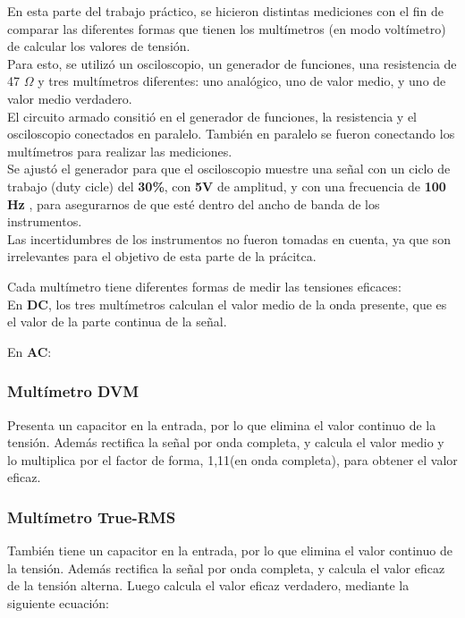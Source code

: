 \documentclass{article}
\begin{document}
En esta parte del trabajo práctico, se hicieron distintas mediciones con el fin de comparar las diferentes formas que tienen los multímetros (en modo voltímetro) de calcular los valores de tensión.\\
\indent Para esto, se utilizó un osciloscopio, un generador de funciones, una resistencia de 47 $\Omega$ y tres multímetros diferentes: uno analógico, uno de valor medio, y uno de valor medio verdadero.\\
\indent El circuito armado consitió en el generador de funciones, la resistencia y el osciloscopio conectados en paralelo. También en paralelo se fueron conectando los multímetros para realizar las mediciones. \\
\indent Se ajustó el generador para que el osciloscopio muestre una señal con un ciclo de trabajo (duty cicle) del \textbf{30\%},
con \textbf{5V} de amplitud, y con una frecuencia de \textbf{100 Hz} , para asegurarnos de que esté dentro del ancho de banda de los instrumentos.\\
\indent Las incertidumbres de los instrumentos no fueron tomadas en cuenta, ya que son irrelevantes para el objetivo de esta parte de la prácitca.
\medskip

Cada multímetro tiene diferentes formas de medir las tensiones eficaces:\\

En \textbf{DC}, los tres multímetros calculan el valor medio de la onda presente, que es el valor de la parte continua de la señal.

En \textbf{AC}:\\

\subsubsection{Multímetro DVM}

Presenta un capacitor en la entrada, por lo que elimina el valor continuo de la tensión. Además rectifica la señal por onda completa, y calcula el valor medio y lo multiplica por el factor de forma, 1,11(en onda completa), para obtener el valor eficaz.\\
\bigskip

\subsubsection{Multímetro True-RMS}

También tiene un capacitor en la entrada, por lo que elimina el valor continuo de la tensión. Además rectifica la señal por onda completa, y calcula el valor eficaz de la tensión alterna. Luego calcula el valor eficaz verdadero, mediante la siguiente ecuación:
\end{document}
